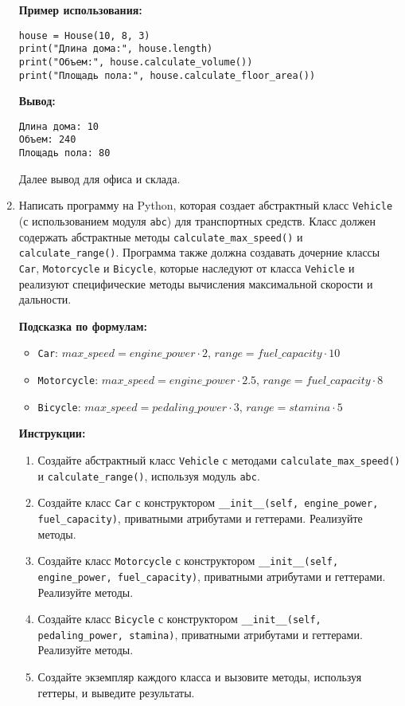 \begin{enumerate}
\textbf{Пример использования:}
\begin{verbatim}
house = House(10, 8, 3)
print("Длина дома:", house.length)
print("Объем:", house.calculate_volume())
print("Площадь пола:", house.calculate_floor_area())
\end{verbatim}

\textbf{Вывод:}
\begin{verbatim}
Длина дома: 10
Объем: 240
Площадь пола: 80
\end{verbatim}

Далее вывод для офиса и склада.

\item
Написать программу на Python, которая создает абстрактный класс \texttt{Vehicle} (с использованием модуля \texttt{abc}) для транспортных средств. 
Класс должен содержать абстрактные методы \texttt{calculate\_max\_speed()} и \texttt{calculate\_range()}. 
Программа также должна создавать дочерние классы \texttt{Car}, \texttt{Motorcycle} и \texttt{Bicycle}, 
которые наследуют от класса \texttt{Vehicle} и реализуют специфические методы вычисления максимальной скорости и дальности.

\textbf{Подсказка по формулам:}
\begin{itemize}
    \item \texttt{Car}: $max\_speed = engine\_power \cdot 2$, $range = fuel\_capacity \cdot 10$
    \item \texttt{Motorcycle}: $max\_speed = engine\_power \cdot 2.5$, $range = fuel\_capacity \cdot 8$
    \item \texttt{Bicycle}: $max\_speed = pedaling\_power \cdot 3$, $range = stamina \cdot 5$
\end{itemize}

\textbf{Инструкции:}
\begin{enumerate}
    \item Создайте абстрактный класс \texttt{Vehicle} с методами \texttt{calculate\_max\_speed()} и \texttt{calculate\_range()}, используя модуль \texttt{abc}.
    \item Создайте класс \texttt{Car} с конструктором \texttt{\_\_init\_\_(self, engine\_power, fuel\_capacity)}, приватными атрибутами и геттерами. Реализуйте методы.
    \item Создайте класс \texttt{Motorcycle} с конструктором \texttt{\_\_init\_\_(self, engine\_power, fuel\_capacity)}, приватными атрибутами и геттерами. Реализуйте методы.
    \item Создайте класс \texttt{Bicycle} с конструктором \texttt{\_\_init\_\_(self, pedaling\_power, stamina)}, приватными атрибутами и геттерами. Реализуйте методы.
    \item Создайте экземпляр каждого класса и вызовите методы, используя геттеры, и выведите результаты.
\end{enumerate}


\end{enumerate}

